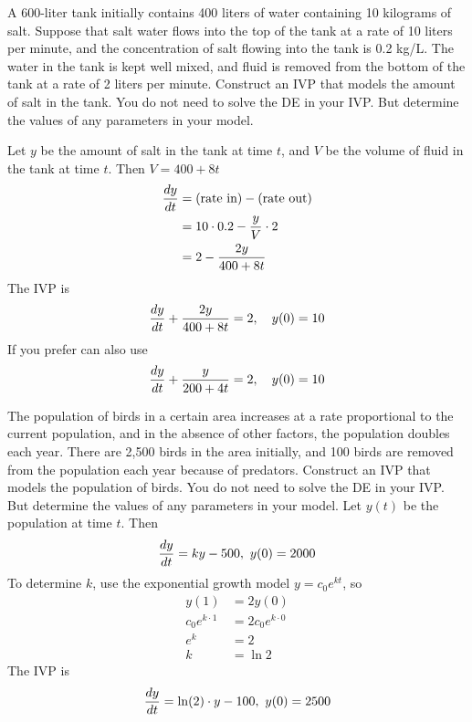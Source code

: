 \ifnum {}
\newpage
\question[2]{} A 600-liter tank initially contains 400 liters of water containing 10 kilograms of salt. Suppose that salt water flows into the top of the tank at a rate of 10 liters per minute, and the concentration of salt flowing into the tank is 0.2 kg/L. The water in the tank is kept well mixed, and fluid is removed from the bottom of the tank at a rate of 2 liters per minute. Construct an IVP that models the amount of salt in the tank. You do not need to solve the DE in your IVP. But determine the values of any parameters in your model. 

\ifnum {} {\color{DarkBlue} 
Let $y$ be the amount of salt in the tank at time $t$, and $V$ be the volume of fluid in the tank at time $t$. Then $V = 400+8t$
\begin{align}
    {\frac{dy}{dt}} 
    &= \left(\text{rate in}\right) - \left(\text{rate out}\right) \\
    &=10\cdot 0.2 - \frac{y}{V}\cdot 2 \\
    &= 2 - \frac{2y}{400+8t}
\end{align}
The IVP is
\begin{align}
    {\frac{dy}{dt}} + \frac{2y}{400+8t} = 2, \quad y(0) = 10
\end{align}
If you prefer can also use
\begin{align}
    {\frac{dy}{dt}} + \frac{y}{200+4t} = 2, \quad y(0) = 10
\end{align}
} 
\else 
\vspace{8cm}
\fi
\fi


\ifnum {}
\newpage
\question[2]{} The population of birds in a certain area increases at a rate proportional to the current population, and in the absence of other factors, the population doubles each year. There are 2,500 birds in the area initially, and 100 birds are removed from the population each year because of predators. Construct an IVP that models the population of birds. You do not need to solve the DE in your IVP. But determine the values of any parameters in your model. 
    \ifnum {} {\color{DarkBlue} 
    Let $y(t)$ be the population at time $t$. Then 
    $${\frac{dy}{dt}} = ky - 500, \ y(0) = 2000$$
    To determine $k$, use the exponential growth model $y = c_0e^{kt}$, so 
    \begin{align}
        y(1) & = 2y(0) \\
        c_0e^{k\cdot1} &= 2c_0e^{k\cdot0} \\
        e^{k} &= 2 \\
        k &= \ln 2
    \end{align}
    The IVP is 
    $${\frac{dy}{dt}} = \ln(2) \cdot y - 100, \ y(0) = 2500$$
    } 
    \else 
    \vspace{8cm}
    \fi
\fi